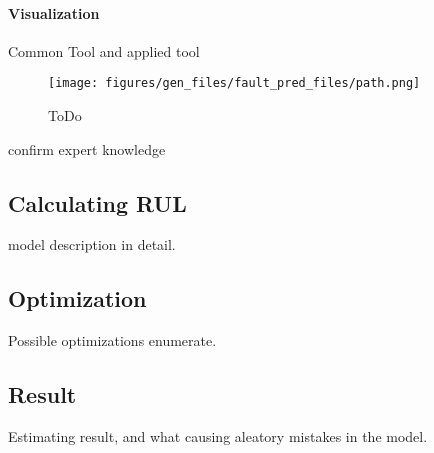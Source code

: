 		\paragraph{Visualization}
		Common Tool and applied tool
			\begin{figure}[!ht]
			\centering
			\texttt{[image: figures/gen\_files/fault\_pred\_files/path.png]}
			\caption{ToDo} 
			\end{figure}
		confirm expert knowledge

	\subsection{Calculating RUL}
model description in detail.
	\subsection{Optimization}
Possible optimizations enumerate.
	\subsection{Result}
Estimating result, and what causing aleatory mistakes in the model. 
\cite{GitHub_FP_RUL}